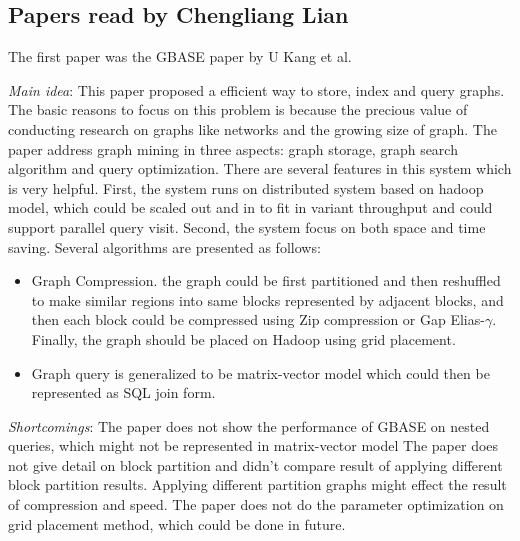 \subsection{Papers read by Chengliang Lian}
The first paper was the GBASE paper by U Kang et al.
\cite{Kang:2012:GEA:2387332.2387347}
\begin{itemize*}
\item {\em Main idea}: 
This paper proposed a efficient way to store, index and query graphs. The basic reasons to focus on this problem is because the precious value of conducting research on graphs like networks and the growing size of graph. The paper address graph mining in three aspects:  graph storage, graph search algorithm and query optimization. There are several features in this system which is very helpful. First, the system runs on distributed system based on hadoop model, which could be scaled out and in to fit in variant throughput and could support parallel query visit. Second, the system focus on both space and time saving. Several algorithms are presented as follows:

\begin{itemize}
\setlength\itemsep{-1.5mm}
  \item Graph Compression. the graph could be first partitioned and then reshuffled to make similar regions into same blocks represented by adjacent blocks, and then each block could be compressed using Zip compression or Gap Elias-$\gamma$. Finally, the graph should be placed on Hadoop using grid placement.
  \item Graph query is generalized to be matrix-vector model which could then be represented as SQL join form. 
\end{itemize}

\item {\em Shortcomings}:
The paper does not show the performance of GBASE on nested queries, which might not be represented in matrix-vector model
The paper does not give detail on block partition and didn't compare result of applying different block partition results. Applying different partition graphs might effect the result of compression and speed.
The paper does not do the parameter optimization on grid placement method, which could be done in future.
\end{itemize*}


